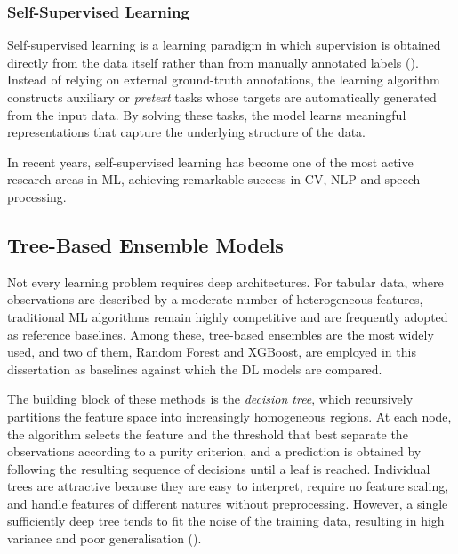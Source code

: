 

\subsubsection{Self-Supervised Learning}

Self-supervised learning is a learning paradigm in which supervision is obtained directly from the data itself rather than from manually annotated labels (\cite{Murphy2022}). Instead of relying on external ground-truth 
annotations, the learning algorithm constructs auxiliary or \textit{pretext} tasks whose targets are automatically generated from the input data. By solving these tasks, the model learns meaningful representations that capture 
the underlying structure of the data.

In recent years, self-supervised learning has become one of the most active research areas in ML, achieving remarkable success in CV, NLP and speech processing.

\subsection{Tree-Based Ensemble Models} \label{sec:tree_ensembles}

Not every learning problem requires deep architectures. For tabular data, where observations are described by a
moderate number of heterogeneous features, traditional ML algorithms remain highly competitive and are frequently
adopted as reference baselines. Among these, tree-based ensembles are the most widely used, and two of them,
Random Forest and XGBoost, are employed in this dissertation as baselines against which the DL models are compared.

The building block of these methods is the \emph{decision tree}, which recursively partitions the feature space
into increasingly homogeneous regions. At each node, the algorithm selects the feature and the threshold that best
separate the observations according to a purity criterion, and a prediction is obtained by following the resulting
sequence of decisions until a leaf is reached. Individual trees are attractive because they are easy to interpret,
require no feature scaling, and handle features of different natures without preprocessing. However, a single
sufficiently deep tree tends to fit the noise of the training data, resulting in high variance and poor
generalisation (\cite{Hastie2009}).

